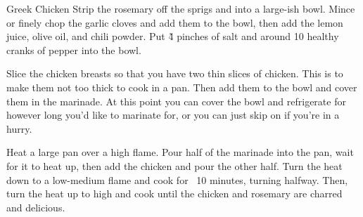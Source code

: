 \begin{recipe}{Greek Chicken}{}{}
Strip the rosemary off the sprigs and into a large-ish bowl.
Mince or finely chop the garlic cloves and add them to the bowl,
then add the lemon juice, olive oil, and chili powder.
Put \~4 pinches of salt and around 10 healthy cranks of pepper into 
the bowl.

Slice the chicken breasts so that you have two thin slices of chicken. 
This is to make them not too thick to cook in a pan. Then add them to 
the bowl and cover them in the marinade. At this point you can cover the bowl 
and refrigerate for however long you'd like to marinate for, 
or you can just skip on if you're in a hurry.

\newstep Heat a large pan over a high flame. Pour half of the marinade into 
the pan, wait for it to heat up, then add the chicken and pour the other 
half. Turn the heat down to a low-medium flame and cook for ~10 minutes, turning halfway. 
Then, turn the heat up to high and cook until the chicken and rosemary are charred and delicious.
\end{recipe}
